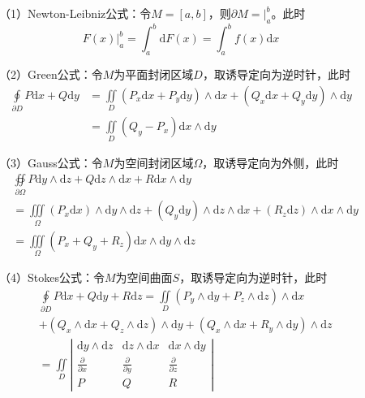 ~~~~（1）Newton-Leibniz公式：令$M=[a,b]$，则$\partial M=\big|_a^b$。此时
\begin{equation*}
    F(x)\big|_a^b =\int_a^b \mathrm{d}F(x)=\int_a^b f(x)\mathrm{d}x
\end{equation*}

~~~~（2）Green公式：令$M$为平面封闭区域$D$，取诱导定向为逆时针，此时
\begin{align*}
    \oint\limits_{\partial D}P\mathrm{d}x+Q\mathrm{d}y &=\iint\limits_D \left(P_x\mathrm{d}x+P_y\mathrm{d}y\right)\wedge\mathrm{d}x+\left(Q_x\mathrm{d}x+Q_y\mathrm{d}y\right)\wedge\mathrm{d}y\\
&=\iint\limits_D \left(Q_y-P_x\right)\mathrm{d}x\wedge \mathrm{d}y
\end{align*}


~~~~（3）Gauss公式：令$M$为空间封闭区域$\Omega$，取诱导定向为外侧，此时
\begin{align*}
    &\oiint\limits_{\partial \Omega} P\mathrm{d} y\wedge\mathrm{d}z+Q\mathrm{d}z\wedge\mathrm{d}x+R\mathrm{d}x\wedge\mathrm{d}y\\
    &=\iiint\limits_{\Omega}\left(P_x\mathrm{d}x\right)\wedge \mathrm{d}y \wedge \mathrm{d}z+\left(Q_y\mathrm{d}y\right)\wedge \mathrm{d}z \wedge \mathrm{d}x+\left(R_z\mathrm{d}z\right)\wedge \mathrm{d}x \wedge \mathrm{d}y\\
    &=\iiint\limits_{\Omega}\left(P_x+Q_y+R_z\right)\mathrm{d}x\wedge\mathrm{d}y\wedge\mathrm{d}z
\end{align*}

~~~~（4）Stokes公式：令$M$为空间曲面$S$，取诱导定向为逆时针，此时
\begin{align*}
    &\oint\limits_{\partial D}P\mathrm{d}x+Q\mathrm{d}y+R\mathrm{d}z=\iint\limits_{D}\left(P_y\wedge \mathrm{d} y +P_z \wedge \mathrm{d} z\right)\wedge \mathrm{d}x \\
    &+\left(Q_x\wedge \mathrm{d} x +Q_z \wedge \mathrm{d} z\right)\wedge \mathrm{d}y+\left(Q_x\wedge \mathrm{d} x +R_y \wedge \mathrm{d} y\right)\wedge \mathrm{d}z\\
    &=\iint\limits_{D} \left|\begin{matrix}
        \mathrm{d}y\wedge\mathrm{d}z &\mathrm{d}z\wedge\mathrm{d}x&\mathrm{d}x\wedge\mathrm{d}y\\
        \frac{\partial }{\partial x} &\frac{\partial }{\partial y}&\frac{\partial }{\partial z}\\
        P&Q&R  
    \end{matrix}\right|
\end{align*}

